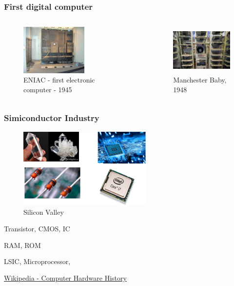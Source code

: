 \documentclass{beamer}
\begin{document}
\begin{frame}
\frametitle{First digital computer}

\begin{columns}
\begin{figure}[h!]
  \includegraphics[height=2.5cm]{img/ENIAC.jpg}
    \caption{ENIAC - first electronic computer - 1945}
\end{figure}
\begin{figure}[h!]
  \includegraphics[height=2.5cm]{img/manchester_baby.jpg}
    \caption{Manchester Baby, 1948}
\end{figure}
\end{columns}

\end{frame}

\begin{frame}
\frametitle{Simiconductor Industry}

\begin{figure}[h!]
  \includegraphics[height=4cm]{img/computer_architecture-simiconductor.png}
    \caption{Silicon Valley}
\end{figure}

Transistor, CMOS, IC

 RAM, ROM

LSIC, Microprocessor,

\href{https://en.wikipedia.org/wiki/History_of_computing_hardware_(1960s\%E2\%80\%93present)}{Wikipedia - Computer Hardware History}
 
\end{frame}
\end{document}
